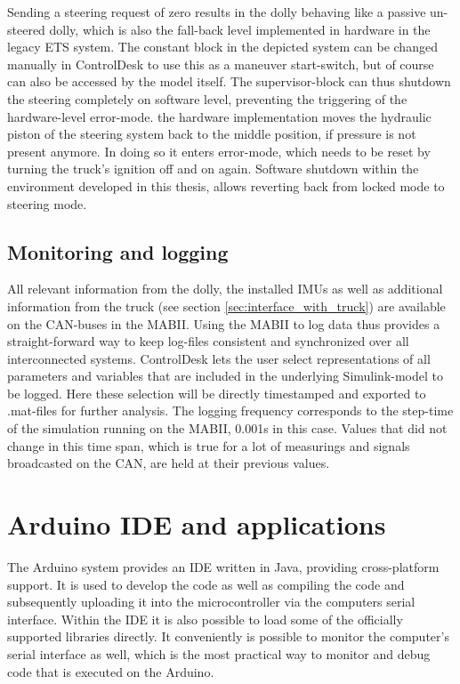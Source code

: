 \documentclass[ExampleMasters.tex]{subfiles}
\begin{document}
Sending a steering request of zero results in the dolly behaving like a passive un-steered dolly, which is also the fall-back level implemented in hardware in the legacy \gls{ETS} system. The constant block in the depicted system can be changed manually in ControlDesk to use this as a maneuver start-switch, but of course can also be accessed by the model itself. The supervisor-block can thus shutdown the steering completely on software level, preventing the triggering of the hardware-level error-mode. the hardware implementation moves the hydraulic piston of the steering system back to the middle position, if pressure is not present anymore. In doing so it enters error-mode, which needs to be reset by turning the truck's ignition off and on again. Software shutdown within the environment developed in this thesis, allows reverting back from locked mode to steering mode. 






\subsection{Monitoring and logging}

All relevant information from the dolly, the installed \gls{IMU}s as well as additional information from the truck (see section \ref{sec:interface_with_truck}) are available on the \gls{CAN}-buses in the \gls{MABII}. Using the \gls{MABII} to log data thus provides a straight-forward way to keep log-files consistent and synchronized over all interconnected systems. ControlDesk lets the user select representations of all parameters and variables that are included in the underlying Simulink-model to be logged. Here these selection will be directly timestamped and exported to .mat-files for further analysis. The logging frequency corresponds to the step-time of the simulation running on the \gls{MABII}, 0.001s in this case. Values that did not change in this time span, which is true for a lot of measurings and signals broadcasted on the \gls{CAN}, are held at their previous values.
\section{Arduino IDE and applications}
\label{sec:arduino_applications}

The Arduino system provides an \gls{IDE}  written in Java, providing cross-platform support. It is used to develop the code as well as compiling the code and subsequently uploading it into the microcontroller via the computers serial interface. Within the IDE it is also possible to load some of the officially supported libraries directly. It conveniently is possible to monitor the computer's serial interface as well, which is the most practical way to monitor and debug code that is executed on the Arduino. 
\end{document}
